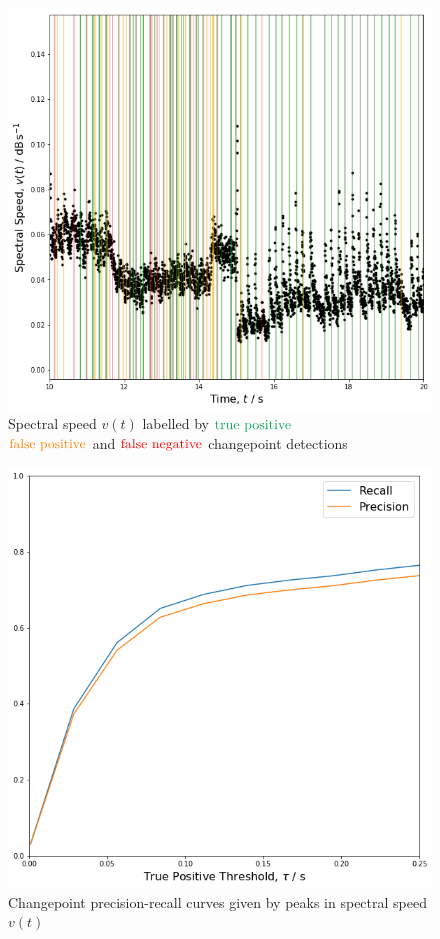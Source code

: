 \documentclass{article}[12pt]
\numberwithin{equation}{section}
\begin{document}
\begin{figure}[H]
\centering{}
\captionsetup{justification=centering}
\includegraphics[scale=0.42]{detections}
\caption{
Spectral speed $v(t)$ labelled by $\color{Green}{\text{true positive}}$\\ $\color{orange}{\text{false positive}}$
and $\color{red}{\text{false negative}}$ changepoint detections
}
\label{fig:speed}
\end{figure}
\begin{figure}[H]
\centering{}
\captionsetup{justification=centering}
\includegraphics[scale=0.42]{pr}
\caption{
Changepoint precision-recall curves given by peaks in spectral speed $v(t)$
}
\label{fig:pr}
\end{figure}
\end{document}
